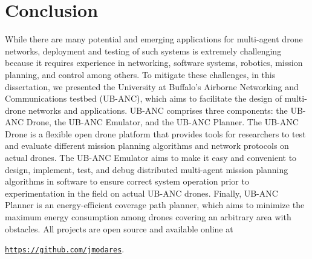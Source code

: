 \chapter{Conclusion}\label{chap:conclusion}

While there are many potential and emerging applications for multi-agent drone networks, deployment and testing of such systems is extremely challenging because it requires experience in networking, software systems, robotics, mission planning, and control among others. To mitigate these challenges, in this dissertation, we presented the University at Buffalo's Airborne Networking and Communications testbed (UB-ANC), which aims to facilitate the design of multi-drone networks and applications. UB-ANC comprises three components: the UB-ANC Drone, the UB-ANC Emulator, and the UB-ANC Planner. The UB-ANC Drone is a flexible open drone platform that provides tools for researchers to test and evaluate different mission planning algorithms and network protocols on actual drones. The UB-ANC Emulator aims to make it easy and convenient to design, implement, test, and debug distributed multi-agent mission planning algorithms in software to ensure correct system operation prior to experimentation in the field on actual UB-ANC drones. Finally, UB-ANC Planner is an energy-efficient coverage path planner, which aims to minimize the maximum energy consumption among drones covering an arbitrary area with obstacles. All projects are open source and available online at 
\begin{center}
{\tt \url{https://github.com/jmodares}}.
\end{center}

